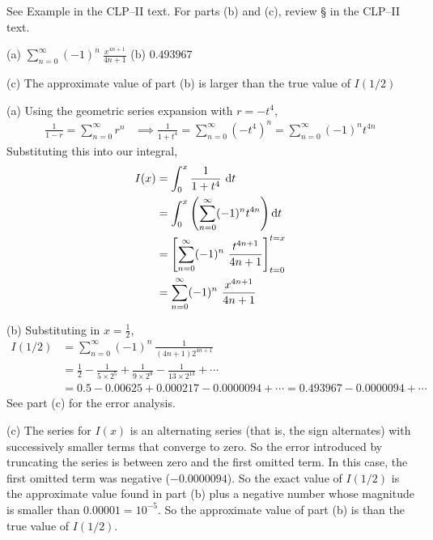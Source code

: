 \begin{hint}
See Example  in the
CLP--II text.
For parts (b) and (c), review  \S {} in the
CLP--II text.

\end{hint}

\begin{answer}
(a) $\displaystyle\sum\limits_{n=0}^\infty (-1)^n\ \frac{x^{4n+1}}{4n+1}$
\qquad (b)
$0.493967$

\noindent (c) The approximate value of part (b) is larger than the true value
of $I(1/2)$
\end{answer}

\begin{solution} (a) Using the geometric series expansion with $r=-t^4$,
\begin{align*}
\frac{1}{1-r} =\sum_{n=0}^\infty r^n
&\implies\frac{1}{1+t^4} =\sum_{n=0}^\infty {(-t^4)}^n =\sum_{n=0}^\infty (-1)^nt^{4n}
\end{align*}
Substituting this into our integral,
\begin{align*}
I(x)
&=\int_0^x\frac{1}{1+t^4}\ \dee{t} \\
&=\int_0^x \left( \sum_{n=0}^\infty (-1)^n t^{4n}\right)\dee{t}\\
&=\left[\sum\limits_{n=0}^\infty (-1)^n\ \frac{t^{4n+1}}{4n+1}\right]_{t=0}^{t=x}\\
&=\sum\limits_{n=0}^\infty (-1)^n\ \frac{x^{4n+1}}{4n+1}
\end{align*}

\noindent (b)  Substituting in $x=\frac{1}{2}$,
\begin{align*}
I(1/2)&=\sum_{n=0}^\infty (-1)^n\ \frac{1}{(4n+1)2^{4n+1}}\\
&=\frac12-\frac{1}{5\times2^5}+\frac{1}{9\times 2^9}
-\frac{1}{13\times 2^{13}}+\cdots\\
&=0.5-0.00625+0.000217-0.0000094+\cdots
=\boxed{0.493967}-0.0000094+\cdots
\end{align*}
See part (c) for the error analysis.

\noindent (c)
The series for $I(x)$ is an alternating series (that is, the sign alternates)
with successively smaller terms that converge to zero. So the error introduced by
truncating the series is between zero and the first omitted term. In this case, the
first omitted term was negative ($-0.0000094$). So the exact value of $I(1/2)$
is the approximate value found in part (b) plus a negative number whose
magnitude is smaller than $0.00001=10^{-5}$.
So the approximate value of part (b) is  than the true value
of $I(1/2)$.

\end{solution}

